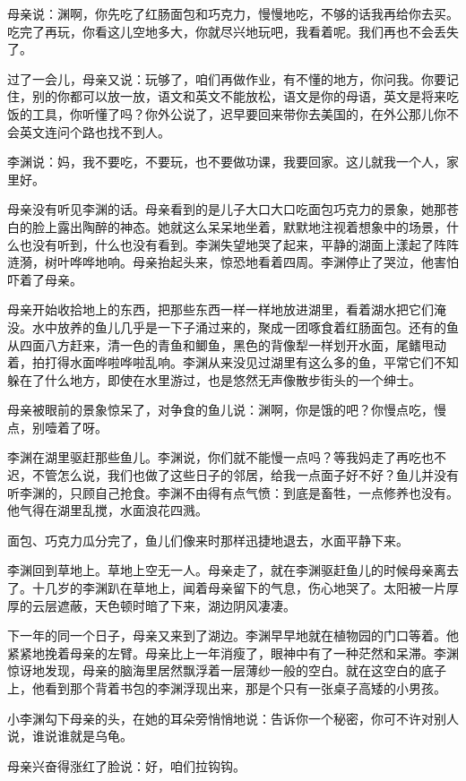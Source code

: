 \documentclass[UTF8]{ctexart}
\begin{document}
母亲说：渊啊，你先吃了红肠面包和巧克力，慢慢地吃，不够的话我再给你去买。吃完了再玩，你看这儿空地多大，你就尽兴地玩吧，我看着呢。我们再也不会丢失了。

过了一会儿，母亲又说：玩够了，咱们再做作业，有不懂的地方，你问我。你要记住，别的你都可以放一放，语文和英文不能放松，语文是你的母语，英文是将来吃饭的工具，你听懂了吗？你外公说了，迟早要回来带你去美国的，在外公那儿你不会英文连问个路也找不到人。

李渊说：妈，我不要吃，不要玩，也不要做功课，我要回家。这儿就我一个人，家里好。

母亲没有听见李渊的话。母亲看到的是儿子大口大口吃面包巧克力的景象，她那苍白的脸上露出陶醉的神态。她就这么呆呆地坐着，默默地注视着想象中的场景，什么也没有听到，什么也没有看到。李渊失望地哭了起来，平静的湖面上漾起了阵阵涟漪，树叶哗哗地响。母亲抬起头来，惊恐地看着四周。李渊停止了哭泣，他害怕吓着了母亲。

母亲开始收拾地上的东西，把那些东西一样一样地放进湖里，看着湖水把它们淹没。水中放养的鱼儿几乎是一下子涌过来的，聚成一团啄食着红肠面包。还有的鱼从四面八方赶来，清一色的青鱼和鲫鱼，黑色的背像犁一样划开水面，尾鳍甩动着，拍打得水面哗啦哗啦乱响。李渊从来没见过湖里有这么多的鱼，平常它们不知躲在了什么地方，即使在水里游过，也是悠然无声像散步街头的一个绅士。

母亲被眼前的景象惊呆了，对争食的鱼儿说：渊啊，你是饿的吧？你慢点吃，慢点，别噎着了呀。

李渊在湖里驱赶那些鱼儿。李渊说，你们就不能慢一点吗？等我妈走了再吃也不迟，不管怎么说，我们也做了这些日子的邻居，给我一点面子好不好？鱼儿并没有听李渊的，只顾自己抢食。李渊不由得有点气愤：到底是畜牲，一点修养也没有。他气得在湖里乱搅，水面浪花四溅。

面包、巧克力瓜分完了，鱼儿们像来时那样迅捷地退去，水面平静下来。

李渊回到草地上。草地上空无一人。母亲走了，就在李渊驱赶鱼儿的时候母亲离去了。十几岁的李渊趴在草地上，闻着母亲留下的气息，伤心地哭了。太阳被一片厚厚的云层遮蔽，天色顿时暗了下来，湖边阴风凄凄。

下一年的同一个日子，母亲又来到了湖边。李渊早早地就在植物园的门口等着。他紧紧地挽着母亲的左臂。母亲比上一年消瘦了，眼神中有了一种茫然和呆滞。李渊惊讶地发现，母亲的脑海里居然飘浮着一层薄纱一般的空白。就在这空白的底子上，他看到那个背着书包的李渊浮现出来，那是个只有一张桌子高矮的小男孩。

小李渊勾下母亲的头，在她的耳朵旁悄悄地说：告诉你一个秘密，你可不许对别人说，谁说谁就是乌龟。

母亲兴奋得涨红了脸说：好，咱们拉钩钩。
\end{document}
